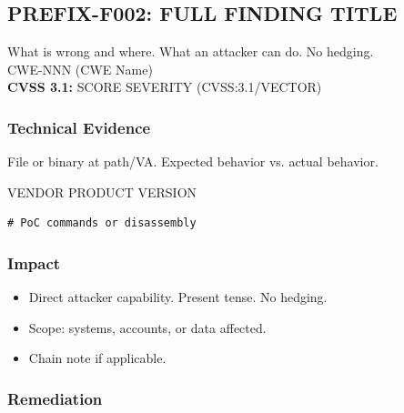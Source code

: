 \documentclass[11pt,a4paper]{article}
\newcommand{\ph}[1]{\lbrack#1\rbrack}
\begin{document}

\subsection{\ph{PREFIX}-F002: \ph{FULL FINDING TITLE}}
\label{sec:f002}

\begin{overviewbox}
\ph{What is wrong and where. What an attacker can do. No hedging.}\\[0.3em]
CWE-\ph{NNN} (\ph{CWE Name})\\
\textbf{CVSS 3.1:} \ph{SCORE} \ph{SEVERITY} (CVSS:3.1/\ph{VECTOR})
\end{overviewbox}

\subsubsection{Technical Evidence}

\ph{File or binary at path/VA. Expected behavior vs. actual behavior.}

\begin{pocbox}{\ph{VENDOR} \ph{PRODUCT} \ph{VERSION}}
\begin{lstlisting}
# PoC commands or disassembly
\end{lstlisting}
\end{pocbox}

\subsubsection{Impact}

\begin{itemize}[noitemsep]
\item \ph{Direct attacker capability. Present tense. No hedging.}
\item \ph{Scope: systems, accounts, or data affected.}
\item \ph{Chain note if applicable.}
\end{itemize}

\subsubsection{Remediation}
\end{document}
